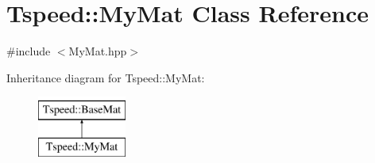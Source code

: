 \hypertarget{classTspeed_1_1MyMat}{\section{Tspeed\-:\-:My\-Mat Class Reference}
\label{classTspeed_1_1MyMat}
}


{\ttfamily \#include $<$My\-Mat.\-hpp$>$}

Inheritance diagram for Tspeed\-:\-:My\-Mat\-:\begin{figure}[H]
\begin{center}
\leavevmode
\includegraphics[height=2.000000cm]{classTspeed_1_1MyMat}
\end{center}
\end{figure}
